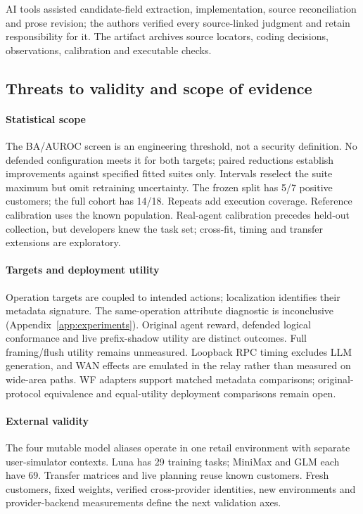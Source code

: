 AI tools assisted candidate-field extraction, implementation, source reconciliation and prose revision; the authors verified every source-linked judgment and retain responsibility for it. The artifact archives source locators, coding decisions, observations, calibration and executable checks.

\subsection{Threats to validity and scope of evidence}\label{sec:validity}
\paragraph{Statistical scope}
The BA/AUROC screen is an engineering threshold, not a security definition. No defended configuration meets it for both targets; paired reductions establish improvements against specified fitted suites only. Intervals reselect the suite maximum but omit retraining uncertainty. The frozen split has 5/7 positive customers; the full cohort has 14/18. Repeats add execution coverage. Reference calibration uses the known population. Real-agent calibration precedes held-out collection, but developers knew the task set; cross-fit, timing and transfer extensions are exploratory.

\paragraph{Targets and deployment utility}
Operation targets are coupled to intended actions; localization identifies their metadata signature. The same-operation attribute diagnostic is inconclusive (Appendix~\ref{app:experiments}). Original agent reward, defended logical conformance and live prefix-shadow utility are distinct outcomes. Full framing/flush utility remains unmeasured. Loopback RPC timing excludes LLM generation, and WAN effects are emulated in the relay rather than measured on wide-area paths. WF adapters support matched metadata comparisons; original-protocol equivalence and equal-utility deployment comparisons remain open.

\paragraph{External validity}
The four mutable model aliases operate in one retail environment with separate user-simulator contexts. Luna has 29 training tasks; MiniMax and GLM each have 69. Transfer matrices and live planning reuse known customers. Fresh customers, fixed weights, verified cross-provider identities, new environments and provider-backend measurements define the next validation axes.
